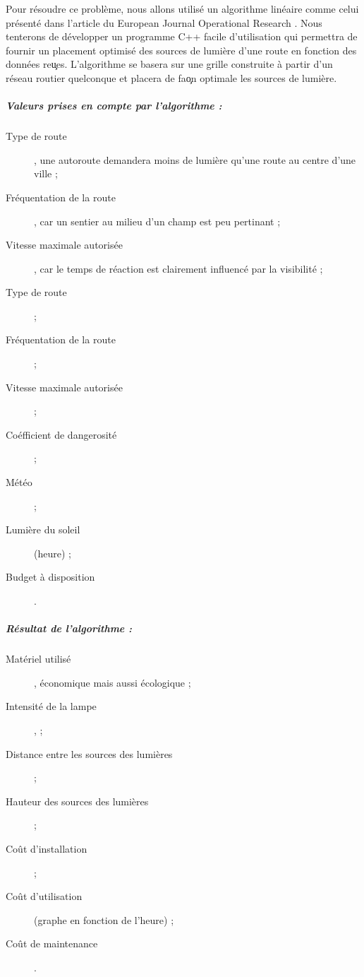 Pour r\'esoudre ce probl\`eme, nous allons utilis\'e un algorithme lin\'eaire comme celui pr\'esent\'e dans l'article du European Journal Operational Research \cite{mainref}. Nous tenterons de d\'evelopper un programme C++ facile d'utilisation qui permettra de fournir un placement optimis\'e des sources de lumi\`ere d'une route en fonction des donn\'ees re\c ues. L'algorithme se basera sur une grille construite \`a partir d'un r\'eseau routier quelconque et placera de fa\c on optimale les sources de lumi\`ere.

\subparagraph{Valeurs prises en compte par l'algorithme :}
\begin{description}
	\item [Type de route], une autoroute demandera moins de lumière qu'une route au centre d'une ville ;
    \item [Fr\'equentation de la route], car un sentier au milieu d'un champ est peu pertinant ;
    \item [Vitesse maximale autoris\'ee], car le temps de r\'eaction est clairement influenc\'e par la visibilit\'e ;
    \item [Type de route] ;
    \item [Fr\'equentation de la route] ;
    \item [Vitesse maximale autoris\'ee] ;
    \item [Co\'efficient de dangerosit\'e] ;
    \item [M\'et\'eo] ;
    \item [Lumi\`ere du soleil] (heure) ;
    \item [Budget \`a disposition].
\end{description}

\subparagraph{R\'esultat de l'algorithme :}
\begin{description}
    \item [Mat\'eriel utilis\'e], \'economique mais aussi \'ecologique ;
    \item [Intensit\'e de la lampe],  ;
    \item [Distance entre les sources des lumi\`eres] ;
    \item [Hauteur des sources des lumi\`eres] ;
    \item [Co\^ut d'installation] ;
    \item [Co\^ut d'utilisation] (graphe en fonction de l'heure) ;
    \item [Co\^ut de maintenance].
\end{description}
